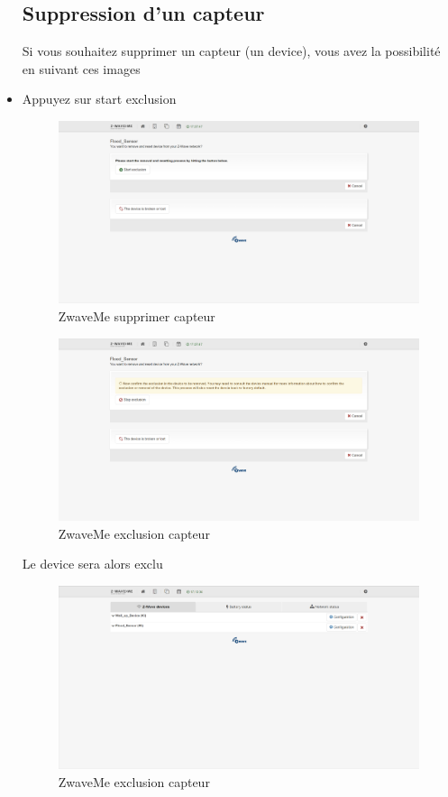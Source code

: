 \begin{itemize}
\subsection{Suppression d'un capteur}
Si vous souhaitez supprimer un capteur (un device), vous avez la possibilité en suivant ces images


\item Appuyez sur start exclusion


\begin{figure}[h]
	\center
	\includegraphics[scale=0.5]{./Images/png/delete_zwaveme.png}
	\caption{ZwaveMe supprimer capteur}
\end{figure}

\begin{figure}[h]
	\center
	\includegraphics[scale=0.5]{./Images/png/exclusion_zwaveme.png}
	\caption{ZwaveMe exclusion capteur}
\end{figure}

Le device sera alors exclu


\begin{figure}[h]
	\center
\includegraphics[scale=0.5]{./Images/png/devices_exclu_zwaveme.png}
	\caption{ZwaveMe exclusion capteur}
\end{figure}



\end{itemize}
